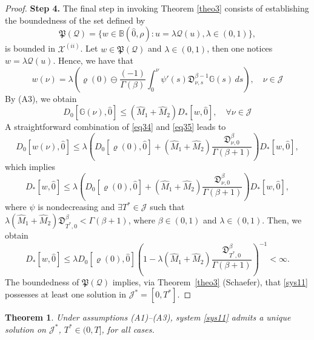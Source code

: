 \documentclass[10pt,a4paper]{amsart}
\numberwithin{equation}{section}
\newtheorem{theorem}[theo]{Theorem}
\begin{document}
\begin{proof}
\noindent\textbf{Step 4.} The final step in invoking Theorem \ref{theo3} consists 
of establishing the boundedness of the set defined by
$$
\mathfrak{P}(\mathcal{Q})=\{ w \in \mathbb{B}(\hat{0}, \rho) :
 u=\lambda \mathcal{Q}(u), \lambda \in(0,1)\},
$$
is bounded in $\mathcal{X}^{(ii)}$. 
Let $ w \in \mathfrak{P}(\mathcal{Q})$ and $\lambda \in(0,1)$, then one notices 
$ w=\lambda \mathcal{Q}(u)$. Hence, we have that
\begin{equation}\label{eq34}
 w(\nu )=\lambda(\varrho(0) \ominus \frac{(-1)}{\Gamma(\beta)} 
 \int_0^{\nu } \psi'(s)\mathfrak{D}_{\nu ,s}^{\beta-1} \mathbb{G}(s)\,ds),
 \quad \nu \in\mathcal{J} 
\end{equation}
By (A3), we obtain
\begin{equation}\label{eq35}
D_0[\mathbb{G}(\nu ), \hat{0}] \leq(\hat{M}_{1}+\hat{M}_{2}) D_{*}[ w, \hat{0}],
 \quad \forall \nu \in\mathcal{J} 
\end{equation}
A straightforward combination of \eqref{eq34} and \eqref{eq35} leads to
$$
D_0[ w(\nu ), \hat{0}] \leq \lambda(D_0[\varrho(0), \hat{0}]+(\hat{M}_{1}
+\hat{M}_{2}) \frac{\mathfrak{D}_{\nu ,0}^{\beta}}{\Gamma(\beta+1)}) D_{*}[ w, \hat{0}],
$$
which implies
$$
D_{*}[ w, \hat{0}] \leq \lambda(D_0[\varrho(0), \hat{0}]+(\hat{M}_{1}+\hat{M}_{2}) 
\frac{\mathfrak{D}_{\nu ,0}^{\beta}}{\Gamma(\beta+1)}) D_{*}[ w, \hat{0}],
$$
where $\psi$ is nondecreasing and $\exists T^{*} \in \mathcal{J}$ such that 
$\lambda(\hat{M}_{1}+\hat{M}_{2})\mathfrak{D}_{T^{*},0}^{\beta}<\Gamma(\beta+1)$, 
where $\beta \in(0,1)$ and $\lambda \in(0,1)$. Then, we obtain
$$
D_{*}[ w, \hat{0}] \leq \lambda D_0[\varrho(0), \hat{0}](1-\lambda(\hat{M}_{1}
+\hat{M}_{2}) \frac{\mathfrak{D}_{T^{*},0}^{\beta}}{\Gamma(\beta+1)})^{-1}<\infty.
$$
The boundedness of $\mathfrak{P}(\mathcal{Q})$ implies, 
via Theorem~\ref{theo3} (Schaefer), that \eqref{sys11} possesses at least one 
solution in $\mathcal{J}^{*}=[0, T^{*}]$.
\end{proof}

\begin{theorem} \label{theo32}
Under assumptions {\rm (A1)--(A3)}, system \eqref{sys11} admits a unique solution 
on $\mathcal{J}^{*}$, $T^{*} \in (0, T]$, for all cases.
\end{theorem}
\end{document}
